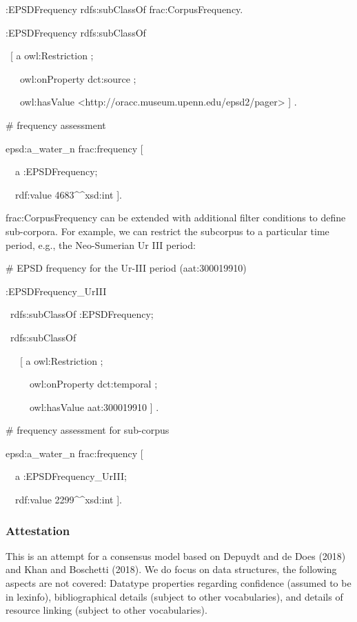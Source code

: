 \documentclass[a4paper]{article}
\newcommand\textstyleSourceText[1]{\textrm{#1}}
\begin{document}
\textstyleSourceText{:EPSDFrequency rdfs:subClassOf frac:CorpusFrequency.}

\textstyleSourceText{:EPSDFrequency rdfs:subClassOf}

\textstyleSourceText{\ [ a owl:Restriction ;}

\textstyleSourceText{\ \ \ owl:onProperty dct:source ;}

\textstyleSourceText{\ \ \ owl:hasValue {\textless}http://oracc.museum.upenn.edu/epsd2/pager{\textgreater} ] .}


\bigskip

\textstyleSourceText{\# frequency assessment}

\textstyleSourceText{epsd:a\_water\_n frac:frequency [ }

\textstyleSourceText{\ \ a :EPSDFrequency;}

\textstyleSourceText{\ \ rdf:value {\textquotedbl}4683{\textquotedbl}\^{}\^{}xsd:int ].}


\bigskip

frac:CorpusFrequency can be extended with additional filter conditions to define sub-corpora. For example, we can restrict the subcorpus to a particular time period, e.g., the Neo-Sumerian Ur III period: 


\bigskip

\textstyleSourceText{\# EPSD frequency for the Ur-III period (aat:300019910)}

\textstyleSourceText{:EPSDFrequency\_UrIII }

\textstyleSourceText{\ rdfs:subClassOf :EPSDFrequency;}

\textstyleSourceText{\ rdfs:subClassOf}

\textstyleSourceText{\ \ \ [ a owl:Restriction ;}

\textstyleSourceText{\ \ \ \ \ owl:onProperty dct:temporal ;}

\textstyleSourceText{\ \ \ \ \ owl:hasValue aat:300019910 ] .}


\bigskip

\textstyleSourceText{\# frequency assessment for sub-corpus}

\textstyleSourceText{epsd:a\_water\_n frac:frequency [ }

\textstyleSourceText{\ \ a :EPSDFrequency\_UrIII;}

\textstyleSourceText{\ \ rdf:value {\textquotedbl}2299{\textquotedbl}\^{}\^{}xsd:int ].}


\bigskip

\subsubsection{Attestation}
This is an attempt for a consensus model based on Depuydt and de Does (2018) and Khan and Boschetti (2018). We do focus on data structures, the following aspects are not covered: Datatype properties regarding confidence (assumed to be in lexinfo), bibliographical details (subject to other vocabularies), and details of resource linking (subject to other vocabularies).
\end{document}
